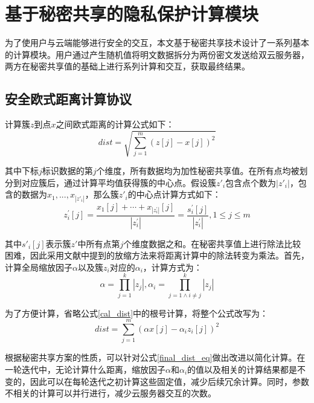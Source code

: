 \section{基于秘密共享的隐私保护计算模块}
\label{s3-mokuai}
为了使用户与云端能够进行安全的交互，本文基于秘密共享技术设计了一系列基本的计算模块。用户通过产生随机值将明文数据拆分为两份密文发送给双云服务器，两方在秘密共享值的基础上进行系列计算和交互，获取最终结果。

\subsection{安全欧式距离计算协议}

计算簇$z$到点$x$之间欧式距离的计算公式如下：
\begin{equation}
	\label{cal_dist}
	dist=\sqrt{\sum_{j=1}^m\left(z[j]-x[j]\right)^2}
\end{equation}

其中下标$j$标识数据的第$j$个维度，所有数据均为加性秘密共享值。在所有点均被划分到对应簇后，通过计算平均值获得簇的中心点。假设簇$z'_i$包含点个数为$|z'_i|$，包含的数据为${x_1,...,x_{|z'_i|}}$，那么簇$z'_i$的中心点计算方式如下：
\begin{equation}
	\label{cal_center}
	z_{i}^{\prime}[j]=\frac{x_{1}[j]+\cdots+x_{\left|z_{i}^{\prime}\right|}[j]}{\left|z_{i}^{\prime}\right|}=\frac{s_{i}^{\prime}[j]}{\left|z_{i}^{\prime}\right|}, 1 \leq j \leq m
\end{equation}

其中$s'_i[j]$表示簇$z'$中所有点第$j$个维度数据之和。在秘密共享值上进行除法比较困难，因此采用文献\cite{wu2020secure}中提到的放缩方法来将距离计算中的除法转变为乘法。首先，计算全局缩放因子$\alpha$以及簇$z_i$对应的$\alpha_i$，计算方式为：
\begin{equation}
	\label{cal_scale}
	\alpha=\prod_{j=1}^{k}\left|z_{j}\right|, \alpha_{i}=\prod_{j=1 \wedge i \neq j}^{k}\left|z_{j}\right|
\end{equation}

为了方便计算，省略公式\ref{cal_dist}中的根号计算，将整个公式改写为：
\begin{equation}
	\label{final_dist_eq}
	dist = \sum_{j=1}^{m}(\alpha x[j] - \alpha_{i}z_i[j])^2
\end{equation}

根据秘密共享方案的性质，可以针对公式\ref{final_dist_eq}做出改进以简化计算。在一轮迭代中，无论计算什么距离，缩放因子$\alpha$和$\alpha_i$的值以及相关的计算结果都是不变的，因此可以在每轮迭代之初计算这些固定值，减少后续冗余计算。同时，参数不相关的计算可以并行进行，减少云服务器交互的次数。

